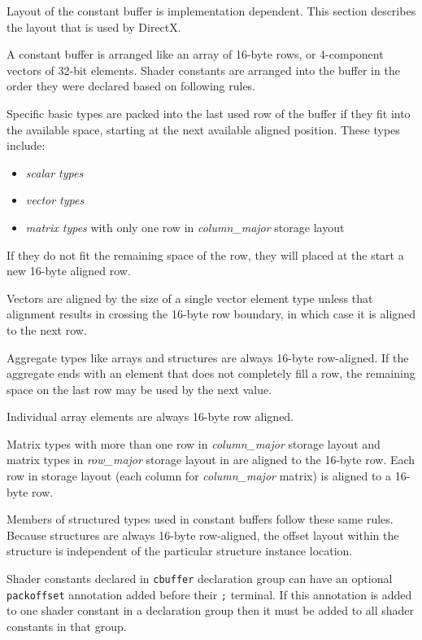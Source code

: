 
\p Layout of the constant buffer is implementation dependent. This section
describes the layout that is used by DirectX.

\p A constant buffer is arranged like an array of 16-byte rows, or 4-component
vectors of 32-bit elements. Shader constants are arranged into the buffer in the
order they were declared based on following rules.

\p Specific basic types are packed into the last used row of the buffer if they
fit into the available space, starting at the next available aligned position.
These types include:
\begin{itemize}
\item \textit{scalar types}
\item \textit{vector types}
\item \textit{matrix types} with only one row in \textit{column\_major} storage layout
\end{itemize}

\p If they do not fit the remaining space of the row, they will placed at the
start a new 16-byte aligned row.

\p Vectors are aligned by the size of a single vector element type unless that
alignment results in crossing the 16-byte row boundary, in which case it is
aligned to the next row.

\p Aggregate types like arrays and structures are always 16-byte row-aligned. If
the aggregate ends with an element that does not completely fill a row, the
remaining space on the last row may be used by the next value.

\p Individual array elements are always 16-byte row aligned.

\p Matrix types with more than one row in \textit{column\_major} storage layout
and matrix types in \textit{row\_major} storage layout in are aligned to the
16-byte row. Each row in storage layout (each column for \textit{column\_major}
matrix) is aligned to a 16-byte row.

\p Members of structured types used in constant buffers follow these same rules.
Because structures are always 16-byte row-aligned, the offset layout within the
structure is independent of the particular structure instance location.


\p Shader constants declared in \texttt{cbuffer} declaration group can have an
optional \texttt{packoffset} annotation added before their \texttt{;} terminal.
If this annotation is added to one shader constant in a declaration group then
it must be added to all shader constants in that group.

